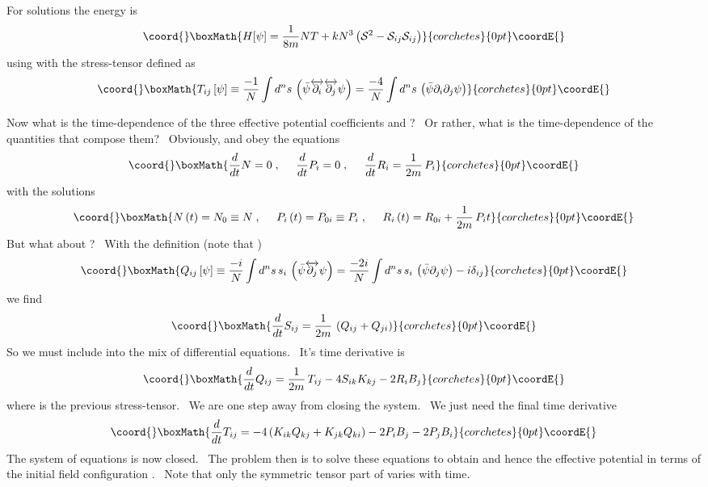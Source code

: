 \documentclass[a4paper,12pt]{article}%
\begin{document}
For solutions the energy is
\[\coord{}\boxMath{
H[\psi]=\frac{1}{8m}NT+kN^{3}\left(  \mathcal{S}^{2}-\mathcal{S}%
_{ij}\mathcal{S}_{ij}\right)
}{corchetes}{0pt}\coordE{}\]
using \coordHE{} with the stress-tensor defined as%
\[\coord{}\boxMath{
T_{ij}\left[  \psi\right]  \equiv\frac{-1}{N}\int d^{n}s\,\left(  \bar{\psi
}\overleftrightarrow{\partial_{i}}\overleftrightarrow{\partial_{j}}%
\psi\right)  =\frac{-4}{N}\int d^{n}s\,\left(  \bar{\psi}\partial_{i}%
\partial_{j}\psi\right)
}{corchetes}{0pt}\coordE{}\]

Now what is the time-dependence of the three effective potential coefficients
\coordHE{}and \coordHE{}? \ Or rather, what is the time-dependence of the
quantities that compose them? \ Obviously, \coordHE{}  \coordHE{} and \coordHE{} obey the
equations
\[\coord{}\boxMath{
\frac{d}{dt}N=0\;,\;\;\;\;\;\frac{d}{dt}P_{i}=0\;,\;\;\;\;\;\frac{d}{dt}%
R_{i}=\frac{1}{2m}\,P_{i}%
}{corchetes}{0pt}\coordE{}\]
with the solutions
\[\coord{}\boxMath{
N\left(  t\right)  =N_{0}\equiv N\;,\;\;\;\;\;P_{i}\left(  t\right)
=P_{0i}\equiv P_{i}\;,\;\;\;\;\;R_{i}\left(  t\right)  =R_{0i}+\frac{1}%
{2m}\,P_{i}t
}{corchetes}{0pt}\coordE{}\]
But what about \coordHE{}? \ With the definition (note that \coordHE{})
\[\coord{}\boxMath{
Q_{ij}\left[  \psi\right]  \equiv\frac{-i}{N}\int d^{n}s\,s_{i}\,\left(
\bar{\psi}\overleftrightarrow{\partial_{j}}\psi\right)  =\frac{-2i}{N}\int
d^{n}s\,s_{i}\,\left(  \bar{\psi}\partial_{j}\psi\right)  -i\delta_{ij}%
}{corchetes}{0pt}\coordE{}\]
we find
\[\coord{}\boxMath{
\frac{d}{dt}S_{ij}=\frac{1}{2m}\,\left(  Q_{ij}+Q_{ji}\right)
}{corchetes}{0pt}\coordE{}\]
So we must include \coordHE{} into the mix of differential equations. \ It's
time derivative is
\[\coord{}\boxMath{
\frac{d}{dt}Q_{ij}=\frac{1}{2m}\,T_{ij}-4S_{ik}K_{kj}-2R_{i}B_{j}%
}{corchetes}{0pt}\coordE{}\]
where \coordHE{} is the previous stress-tensor. \ We are
one step away from closing the system. \ We just need the final time
derivative
\[\coord{}\boxMath{
\frac{d}{dt}T_{ij}=-4\left(  K_{ik}Q_{kj}+K_{jk}Q_{ki}\right)  -2P_{i}%
B_{j}-2P_{j}B_{i}%
}{corchetes}{0pt}\coordE{}\]
The system of equations is now closed. \ The problem then is to solve these
equations to obtain \coordHE{} and hence the effective potential in terms of the
initial field configuration . \ Note that only the symmetric tensor part of
\coordHE{} varies with time. \ 
\end{document}
